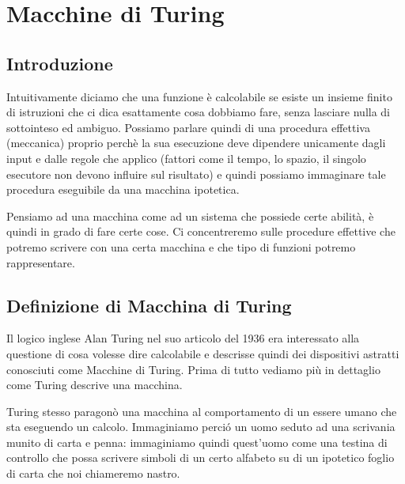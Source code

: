 \newcommand{\bew}{\mathsf{Bew}}
\newcommand{\eq}[1]{\begin{equation} #1 \end{equation}}
\newcommand{\gdnum}[1]{\ulcorner #1 \urcorner}
\newcommand{\eqconnome}[2]{\begin{equation} \label{eq:#2} #1 \end{equation}}

\chapter{Macchine di Turing}

\section{Introduzione}
Intuitivamente diciamo che una funzione \`e calcolabile se esiste un insieme
finito di istruzioni che ci dica esattamente cosa dobbiamo fare, senza lasciare
nulla di sottointeso ed ambiguo. Possiamo parlare quindi di una procedura
effettiva (meccanica) proprio perch\`e la sua esecuzione deve dipendere
unicamente dagli input e dalle regole che applico (fattori come il tempo, lo
spazio, il singolo esecutore non devono influire sul risultato) e quindi
possiamo immaginare tale procedura eseguibile da una macchina ipotetica.

Pensiamo ad una macchina come ad un sistema che possiede certe abilit\`a, \`e
quindi in grado di fare certe cose. Ci concentreremo sulle procedure effettive
che potremo scrivere con una certa macchina e che tipo di funzioni potremo
rappresentare.

\section{Definizione di Macchina di Turing}
Il logico inglese Alan Turing nel suo articolo del 1936 era interessato alla
questione di cosa volesse dire calcolabile e descrisse quindi dei dispositivi
astratti conosciuti come Macchine di Turing. Prima di tutto vediamo pi\`u in
dettaglio come Turing descrive una macchina.

Turing stesso paragon\`o una macchina al comportamento di un essere umano che
sta eseguendo un calcolo.  Immaginiamo perci\'o un uomo seduto ad una scrivania
munito di carta e penna: immaginiamo quindi quest'uomo come una testina di
controllo che possa scrivere simboli di un certo alfabeto su di un ipotetico
foglio di carta che noi chiameremo nastro.


